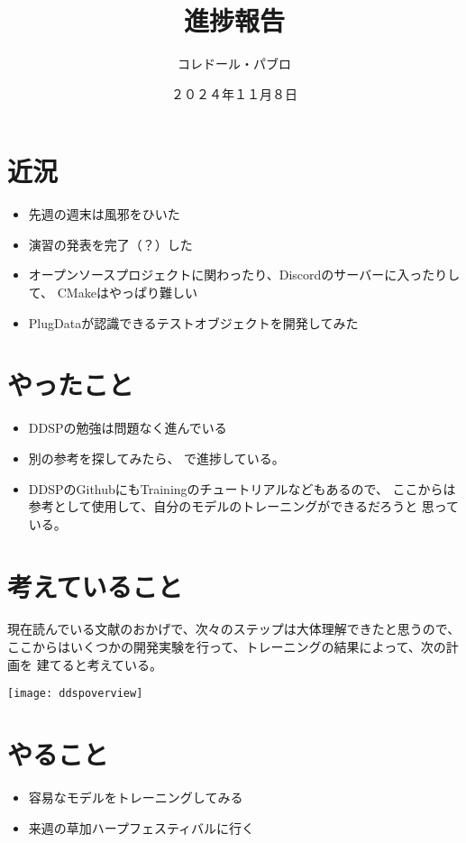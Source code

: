\documentclass[a4paper, 12pt]{article}
\title{進捗報告}
\author{コレドール・パブロ}
\date{２０２４年１１月８日}
\begin{document}
\maketitle

\section*{近況}
\begin{itemize}
    \item 先週の週末は風邪をひいた
    \item 演習の発表を完了（？）した
    \item オープンソースプロジェクトに関わったり、Discordのサーバーに入ったりして、
    CMakeはやっぱり難しい
    \item PlugDataが認識できるテストオブジェクトを開発してみた
\end{itemize} 

\section*{やったこと}
\begin{itemize}
    \item DDSPの勉強は問題なく進んでいる
    \item 別の参考を探してみたら、\cite{ddspTutorial}
    で進捗している。
    \item DDSPのGithubにもTrainingのチュートリアルなどもあるので、
    ここからは参考として使用して、自分のモデルのトレーニングができるだろうと
    思っている。
\end{itemize}

\section*{考えていること}

現在読んでいる文献のおかげで、次々のステップは大体理解できたと思うので、
ここからはいくつかの開発実験を行って、トレーニングの結果によって、次の計画を
建てると考えている。

\texttt{[image: ddspoverview]}

\section*{やること}
\begin{itemize}
    \item 容易なモデルをトレーニングしてみる
    \item 来週の草加ハープフェスティバルに行く
\end{itemize}



\end{document}
